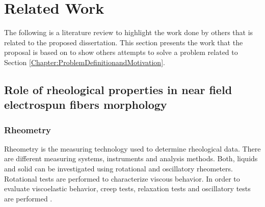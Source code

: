 
\chapter{Related Work} %

\label{Chapter:RelatedWork}


The following is a literature review to highlight the work done by others that is related to the proposed dissertation. This section presents the work that the proposal is based on to show others attempts to solve a problem related to Section \ref{Chapter:ProblemDefinitionandMotivation}.


\section{Role of rheological properties in near field electrospun fibers morphology \cite{Flores2017}}

\label{sec:FloresWrk}

\subsection{Rheometry}
Rheometry is the measuring technology used to determine rheological data. There are different measuring systems, instruments and analysis methods. Both, liquids and solid  can be investigated using rotational and oscillatory rheometers. Rotational tests are performed to characterize viscous behavior. In order to evaluate viscoelastic behavior, creep tests, relaxation tests and oscillatory tests are performed \cite{Flores2017}.

